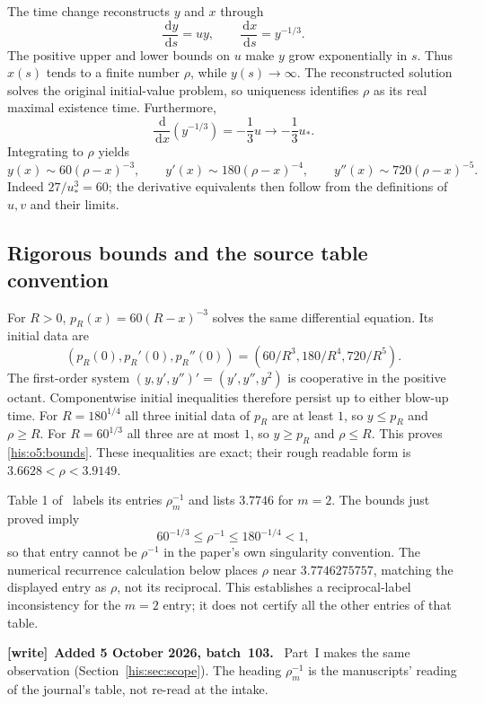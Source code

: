 \documentclass[11pt]{article}
\theoremstyle{remark}\newtheorem{remark}[theorem]{Remark}
\newcommand{\dd}{\,\mathrm d}
\numberwithin{equation}{section}
\newenvironment{writenote}[1][]{\par\smallskip\begingroup\small
 \noindent\textbf{[write]}\if\relax\detokenize{#1}\relax\else~\textbf{#1.}\fi\ }%
 {\par\endgroup\smallskip}
\begin{document}
The time change reconstructs $y$ and $x$ through
\[
\frac{\dd y}{\dd s}=uy,\qquad
\frac{\dd x}{\dd s}=y^{-1/3}.
\]
The positive upper and lower bounds on $u$ make $y$ grow exponentially
in $s$. Thus $x(s)$ tends to a finite number $\rho$, while $y(s)\to\infty$.
The reconstructed solution solves the original initial-value problem,
so uniqueness identifies $\rho$ as its real maximal existence time.
Furthermore,
\[
\frac{\dd}{\dd x}(y^{-1/3})=-\frac13u\longrightarrow-\frac13u_*.
\]
Integrating to $\rho$ yields
\begin{equation}\label{his:o5:profile}
y(x)\sim60(\rho-x)^{-3},\qquad
y'(x)\sim180(\rho-x)^{-4},\qquad
y''(x)\sim720(\rho-x)^{-5}.
\end{equation}
Indeed $27/u_*^3=60$; the derivative equivalents then follow from
the definitions of $u,v$ and their limits.

\subsection{Rigorous bounds and the source table convention}
For $R>0$, $p_R(x)=60(R-x)^{-3}$ solves the same differential equation.
Its initial data are
\[
(p_R(0),p_R'(0),p_R''(0))=(60/R^3,180/R^4,720/R^5).
\]
The first-order system $(y,y',y'')'=(y',y'',y^2)$ is cooperative in
the positive octant. Componentwise initial inequalities therefore persist
up to either blow-up time. For $R=180^{1/4}$ all three initial data of
$p_R$ are at least $1$, so $y\le p_R$ and $\rho\ge R$.
For $R=60^{1/3}$ all three are at most $1$, so $y\ge p_R$ and $\rho\le R$.
This proves \eqref{his:o5:bounds}. These inequalities are exact; their rough
readable form is $3.6628<\rho<3.9149$.

Table 1 of~\cite[p.~10]{bw2026} labels its entries $\rho_m^{-1}$ and lists
$3.7746$ for $m=2$. The bounds just proved imply
\[
60^{-1/3}\le\rho^{-1}\le180^{-1/4}<1,
\]
so that entry cannot be $\rho^{-1}$ in the paper's own singularity
convention. The numerical recurrence calculation below places $\rho$
near $3.7746275757$, matching the displayed entry as $\rho$, not its
reciprocal. This establishes a reciprocal-label inconsistency for the
$m=2$ entry; it does not certify all the other entries of that table.
\begin{writenote}[Added 5 October 2026, batch~103]
Part~I makes the same observation (Section~\ref{his:sec:scope}). The heading $\rho_m^{-1}$ is the manuscripts' reading of the journal's table, not re-read at the intake.
\end{writenote}
\end{document}
